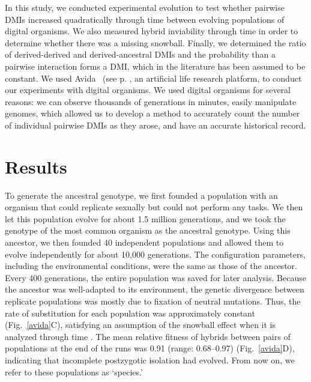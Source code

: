 \begin{doublespace}


In this study, we conducted experimental evolution
to test whether pairwise DMIs increased quadratically through time
between evolving populations of digital organisms.
%
We also measured hybrid inviability through time
in order to determine whether there was a missing snowball.
%
Finally, we determined the ratio of derived-derived and derived-ancestral DMIs
and the probability than a pairwise interaction forms a DMI,
which in the literature has been assumed to be constant.
%
We used Avida~\citep{ofr04} (see p. \pageref{sec:avida},
an artificial life research platform,
to conduct our experiments with digital organisms.
%
We used digital organisms for several reasons:
we can observe thousands of generations in minutes,
easily manipulate genomes, which allowed us to
develop a method to accurately count the number of individual pairwise DMIs
as they arose,
and have an accurate historical record.







\section{Results}

To generate the ancestral genotype, we first founded a population
with an organism that could replicate sexually but could not perform any tasks.
%
We then let this population evolve for about 1.5 million generations,
and we took the genotype of the most common organism as the ancestral genotype.
%
Using this ancestor, we then founded 40 independent populations
and allowed them to evolve independently for about 10,000 generations.
%
The configuration parameters, including the environmental conditions,
were the same as those of the ancestor.
%
Every 400 generations, the entire population was saved for later analysis.
%
Because the ancestor was well-adapted to its environment,
the genetic divergence between replicate populations
was mostly due to fixation of neutral mutations.
%
Thus, the rate of substitution for each population
was approximately constant (Fig.~\ref{avida}C),
satisfying an assumption of the snowball effect
when it is analyzed through time \citep{orr95}.
%
The mean relative fitness of hybrids between pairs of populations
at the end of the runs was 0.91 (range: 0.68--0.97) (Fig.~\ref{avida}D),
indicating that incomplete postzygotic isolation had evolved.
%
From now on, we refer to these populations as `species.'




\end{doublespace}
